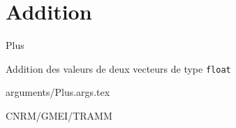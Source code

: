 %
\section{Addition}

 {\sf Plus}

Addition des valeurs de deux vecteurs de type {\tt float}

\bigskip
 {arguments/Plus.args.tex}




CNRM/GMEI/TRAMM

